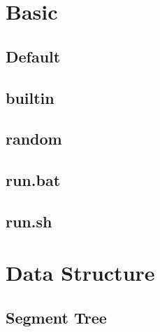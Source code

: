 \documentclass[a4paper,10pt,twocolumn,oneside]{article}
\begin{document}
\pagestyle{fancy}
\fancyfoot{}
\fancyhead[R]{\thepage}
\renewcommand{\headrulewidth}{0.4pt}
\renewcommand{\contentsname}{Contents} 

\newcommand{\includetex}[2]{
  \subsection{#1}
  
  \vspace{-1.2em}
}
\scriptsize
\tableofcontents

\section{Basic}
    \subsection{Default}
    

    \subsection{builtin}
    

    \subsection{random}
    

    \subsection{run.bat}
    

    \subsection{run.sh}
    

\section{Data Structure}
    \subsection{Segment Tree}
    
\end{document}
